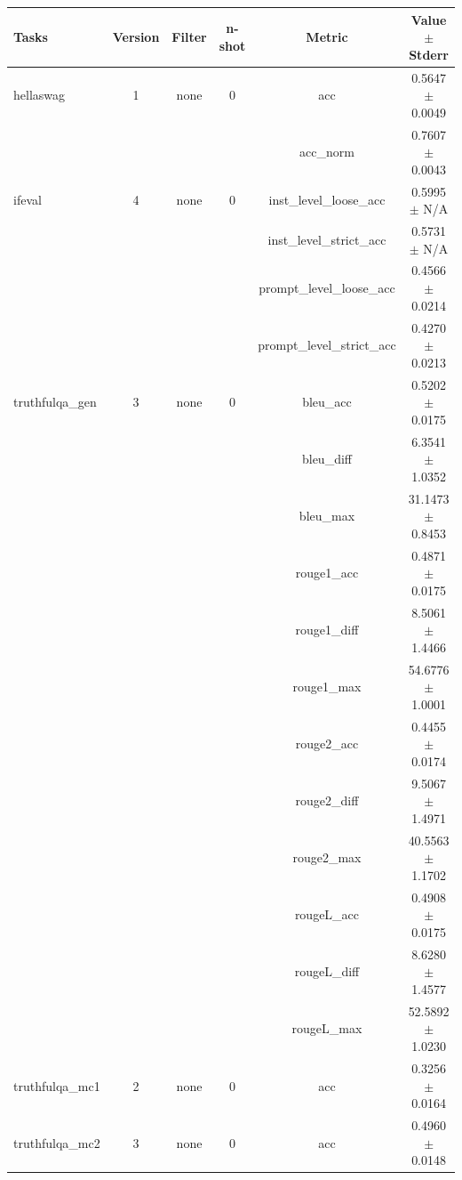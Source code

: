\documentclass{ifacconf}
\begin{document}
\vfill
\clearpage
\pagebreak

\begin{minipage}{\textwidth}
    \begin{table}[H]
    \centering
    \begin{tabular}{|l|c|c|c|c|c|}
    \hline
    \textbf{Tasks} & \textbf{Version} & \textbf{Filter} & \textbf{n-shot} & \textbf{Metric} & \textbf{Value} $\pm$ \textbf{Stderr} \\ \hline
    hellaswag & 1 & none & 0 & acc & 0.5647 $\pm$ 0.0049 \\ \hline
    & & & & acc\_norm & 0.7607 $\pm$ 0.0043 \\ \hline
    ifeval & 4 & none & 0 & inst\_level\_loose\_acc & 0.5995 $\pm$ N/A \\ \hline
    & & & & inst\_level\_strict\_acc & 0.5731 $\pm$ N/A \\ \hline
    & & & & prompt\_level\_loose\_acc & 0.4566 $\pm$ 0.0214 \\ \hline
    & & & & prompt\_level\_strict\_acc & 0.4270 $\pm$ 0.0213 \\ \hline
    truthfulqa\_gen & 3 & none & 0 & bleu\_acc & 0.5202 $\pm$ 0.0175 \\ \hline
    & & & & bleu\_diff & 6.3541 $\pm$ 1.0352 \\ \hline
    & & & & bleu\_max & 31.1473 $\pm$ 0.8453 \\ \hline
    & & & & rouge1\_acc & 0.4871 $\pm$ 0.0175 \\ \hline
    & & & & rouge1\_diff & 8.5061 $\pm$ 1.4466 \\ \hline
    & & & & rouge1\_max & 54.6776 $\pm$ 1.0001 \\ \hline
    & & & & rouge2\_acc & 0.4455 $\pm$ 0.0174 \\ \hline
    & & & & rouge2\_diff & 9.5067 $\pm$ 1.4971 \\ \hline
    & & & & rouge2\_max & 40.5563 $\pm$ 1.1702 \\ \hline
    & & & & rougeL\_acc & 0.4908 $\pm$ 0.0175 \\ \hline
    & & & & rougeL\_diff & 8.6280 $\pm$ 1.4577 \\ \hline
    & & & & rougeL\_max & 52.5892 $\pm$ 1.0230 \\ \hline
    truthfulqa\_mc1 & 2 & none & 0 & acc & 0.3256 $\pm$ 0.0164 \\ \hline
    truthfulqa\_mc2 & 3 & none & 0 & acc & 0.4960 $\pm$ 0.0148 \\ \hline
    \end{tabular}
    \label{tab:llama31_vptq}
    \end{table}


\end{minipage}
\end{document}
